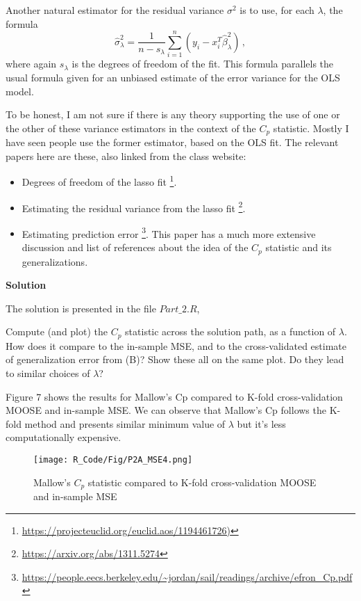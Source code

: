 \documentclass[11 pt]{article}
\begin{document}
\begin{enumerate}[label=(\Alph*)]
Another natural estimator for the residual variance $\sigma^2$ is to use, for each $\lambda$, the formula
$$
\hat{\sigma}^2_{\lambda} = \frac{1}{n - s_{\lambda}} \sum_{i=1}^n (y_i - x_i^T \hat \beta_{\lambda}^2) \, ,
$$
where again $s_{\lambda}$ is the degrees of freedom of the fit.  This formula parallels the usual formula given for an unbiased estimate of the error variance for the OLS model.

To be honest, I am not sure if there is any theory supporting the use of one or the other of these variance estimators in the context of the $C_p$ statistic.  Mostly I have seen people use the former estimator, based on the OLS fit.  The relevant papers here are these, also linked from the class website:
\begin{itemize}
	\item Degrees of freedom of the lasso fit \footnote{\url{https://projecteuclid.org/euclid.aos/1194461726)}}.
	\item Estimating the residual variance from the lasso fit \footnote{\url{https://arxiv.org/abs/1311.5274}}.
	\item Estimating prediction error \footnote{ \url{https://people.eecs.berkeley.edu/~jordan/sail/readings/archive/efron_Cp.pdf}}.  This paper has a much more extensive discussion and list of references about the idea of the $C_p$ statistic and its generalizations.
\end{itemize}

\vspace{10mm}
\textbf{Solution}

The solution is presented in the file $Part\_2.R$,



Compute (and plot) the $C_p$ statistic across the solution path, as a function of $\lambda$.  How does it compare to the in-sample MSE, and to the cross-validated estimate of generalization error from (B)?  Show these all on the same plot.  Do they lead to similar choices of $\lambda$?

\vspace{2mm}
Figure 7 shows the results for Mallow's Cp compared to K-fold cross-validation MOOSE and in-sample MSE. We can observe that Mallow's Cp follows the K-fold method and presents similar minimum value of $\lambda$ but it's less computationally expensive.

\begin{figure}[H]
	\begin{center}
		\texttt{[image: R\_Code/Fig/P2A\_MSE4.png]}
		\caption{Mallow's $C_p$ statistic compared to K-fold cross-validation MOOSE and in-sample MSE}
	\end{center}
\end{figure}

\end{enumerate}
\end{document}
